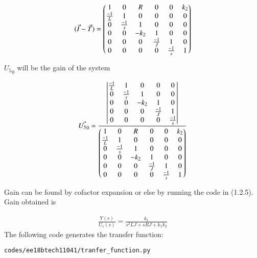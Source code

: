 \begin{enumerate}[label=\thesection.\arabic*.,ref=\thesection.\theenumi]
\begin{align}
    (\Vec{I}-\Vec{T}) = \begin{pmatrix}1 & 0 & R & 0 & 0 & k_2\\
    \frac{-1}{L} & 1 & 0 & 0 & 0 & 0\\
    0 & \frac{-1}{s} & 1 & 0 & 0 & 0\\
    0 & 0 & -k_2 & 1 & 0 & 0\\
    0 & 0 & 0 & \frac{-1}{J} & 1 & 0\\
    0 & 0 & 0 & 0& \frac{-1}{s} & 1 \end{pmatrix} 
\end{align}

${U_5}_0$ will be the gain of the system

\begin{align}
    \Vec{{U_5}_0} = \frac{\begin{vmatrix}\frac{-1}{L} & 1 & 0 & 0 & 0 \\
    0 & \frac{-1}{s} & 1 & 0 & 0 \\
    0 & 0 & -k_2 & 1 & 0 \\
    0 & 0 & 0 & \frac{-1}{J} & 1 \\
    0 & 0 & 0 & 0& \frac{-1}{s} \end{vmatrix}}{ \begin{pmatrix}1 & 0 & R & 0 & 0 & k_2\\
    \frac{-1}{L} & 1 & 0 & 0 & 0 & 0\\
    0 & \frac{-1}{s} & 1 & 0 & 0 & 0\\
    0 & 0 & -k_2 & 1 & 0 & 0\\
    0 & 0 & 0 & \frac{-1}{J} & 1 & 0\\
    0 & 0 & 0 & 0& \frac{-1}{s} & 1 \end{pmatrix}}
\end{align}

Gain can be found by cofactor expansion or else by running the code in (1.2.5).
Gain obtained is 

\begin{align}
    \frac{Y(s)}{U_1(s)}=\frac{k_1}{s^2LJ+sRJ+k_1k_2}
\end{align}
The following code generates the transfer function:
\begin{lstlisting}
codes/ee18btech11041/tranfer_function.py
\end{lstlisting}



\end{enumerate}
